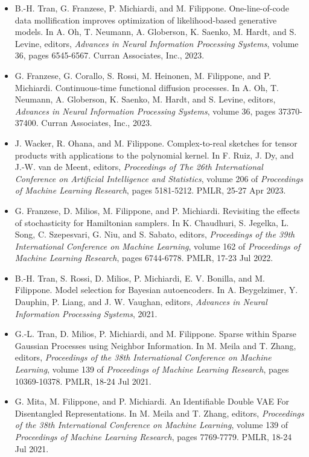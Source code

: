 \begin{itemize}
\item  B.-H. Tran, G. Franzese, P. Michiardi, and M. Filippone. One-line-of-code data mollification improves optimization of likelihood-based generative models. In A. Oh, T. Neumann, A. Globerson, K. Saenko, M. Hardt, and S. Levine, editors, \emph{Advances in Neural Information Processing Systems}, volume 36, pages 6545-6567. Curran Associates, Inc., 2023.  
\item  G. Franzese, G. Corallo, S. Rossi, M. Heinonen, M. Filippone, and P. Michiardi. Continuous-time functional diffusion processes. In A. Oh, T. Neumann, A. Globerson, K. Saenko, M. Hardt, and S. Levine, editors, \emph{Advances in Neural Information Processing Systems}, volume 36, pages 37370-37400. Curran Associates, Inc., 2023.  
\item  J. Wacker, R. Ohana, and M. Filippone. Complex-to-real sketches for tensor products with applications to the polynomial kernel. In F. Ruiz, J. Dy, and J.-W. van de Meent, editors, \emph{Proceedings of The 26th International Conference on Artificial Intelligence and Statistics}, volume 206 of \emph{Proceedings of Machine Learning Research}, pages 5181-5212. PMLR, 25-27 Apr 2023.  
\item  G. Franzese, D. Milios, M. Filippone, and P. Michiardi. Revisiting the effects of stochasticity for Hamiltonian samplers. In K. Chaudhuri, S. Jegelka, L. Song, C. Szepesvari, G. Niu, and S. Sabato, editors, \emph{Proceedings of the 39th International Conference on Machine Learning}, volume 162 of \emph{Proceedings of Machine Learning Research}, pages 6744-6778. PMLR, 17-23 Jul 2022.  
\item  B.-H. Tran, S. Rossi, D. Milios, P. Michiardi, E. V. Bonilla, and M. Filippone. Model selection for Bayesian autoencoders. In A. Beygelzimer, Y. Dauphin, P. Liang, and J. W. Vaughan, editors, \emph{Advances in Neural Information Processing Systems}, 2021.  
\item  G.-L. Tran, D. Milios, P. Michiardi, and M. Filippone. Sparse within Sparse Gaussian Processes using Neighbor Information. In M. Meila and T. Zhang, editors, \emph{Proceedings of the 38th International Conference on Machine Learning}, volume 139 of \emph{Proceedings of Machine Learning Research}, pages 10369-10378. PMLR, 18-24 Jul 2021.  
\item  G. Mita, M. Filippone, and P. Michiardi. An Identifiable Double VAE For Disentangled Representations. In M. Meila and T. Zhang, editors, \emph{Proceedings of the 38th International Conference on Machine Learning}, volume 139 of \emph{Proceedings of Machine Learning Research}, pages 7769-7779. PMLR, 18-24 Jul 2021.  

\end{itemize}
